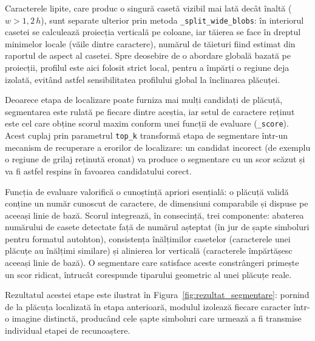 Caracterele lipite, care produc o singură casetă vizibil mai lată decât înaltă ($w > 1{,}2\,h$), sunt separate ulterior prin metoda \texttt{\_split\_wide\_blobs}: în interiorul casetei se calculează proiecția verticală pe coloane, iar tăierea se face în dreptul minimelor locale (văile dintre caractere), numărul de tăieturi fiind estimat din raportul de aspect al casetei. Spre deosebire de o abordare globală bazată pe proiecții, profilul este aici folosit strict local, pentru a împărți o regiune deja izolată, evitând astfel sensibilitatea profilului global la înclinarea plăcuței.

Deoarece etapa de localizare poate furniza mai mulți candidați de plăcuță, segmentarea este rulată pe fiecare dintre aceștia, iar setul de caractere reținut este cel care obține scorul maxim conform unei funcții de evaluare (\texttt{\_score}). Acest cuplaj prin parametrul \texttt{top\_k} transformă etapa de segmentare într-un mecanism de recuperare a erorilor de localizare: un candidat incorect (de exemplu o regiune de grilaj reținută eronat) va produce o segmentare cu un scor scăzut și va fi astfel respins în favoarea candidatului corect.

Funcția de evaluare valorifică o cunoștință apriori esențială: o plăcuță validă conține un număr cunoscut de caractere, de dimensiuni comparabile și dispuse pe aceeași linie de bază. Scorul integrează, în consecință, trei componente: abaterea numărului de casete detectate față de numărul așteptat (în jur de șapte simboluri pentru formatul autohton), consistența înălțimilor casetelor (caracterele unei plăcuțe au înălțimi similare) și alinierea lor verticală (caracterele împărtășesc aceeași linie de bază). O segmentare care satisface aceste constrângeri primește un scor ridicat, întrucât corespunde tiparului geometric al unei plăcuțe reale.

Rezultatul acestei etape este ilustrat în Figura~\ref{fig:rezultat_segmentare}: pornind de la plăcuța localizată în etapa anterioară, modulul izolează fiecare caracter într-o imagine distinctă, producând cele șapte simboluri care urmează a fi transmise individual etapei de recunoaștere.

